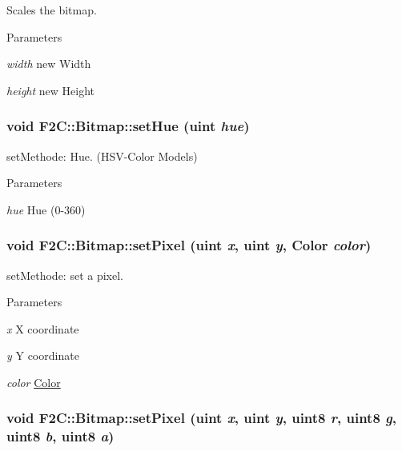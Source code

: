 Scales the bitmap. 
\begin{DoxyParams}{Parameters}
\item[{\em width}]new Width \item[{\em height}]new Height \end{DoxyParams}
\hypertarget{class_f2_c_1_1_bitmap_aaa06d532deca94bc4c655951a137c49a}{
\subsubsection[{setHue}]{\setlength{\rightskip}{0pt plus 5cm}void F2C::Bitmap::setHue ({\bf uint} {\em hue})}}
\label{class_f2_c_1_1_bitmap_aaa06d532deca94bc4c655951a137c49a}


setMethode: Hue. (HSV-\/Color Models) 
\begin{DoxyParams}{Parameters}
\item[{\em hue}]Hue (0-\/360) \end{DoxyParams}
\hypertarget{class_f2_c_1_1_bitmap_ada18c311c9e0cd0ba4c413b7cce2fb62}{
\subsubsection[{setPixel}]{\setlength{\rightskip}{0pt plus 5cm}void F2C::Bitmap::setPixel ({\bf uint} {\em x}, \/  {\bf uint} {\em y}, \/  {\bf Color} {\em color})}}
\label{class_f2_c_1_1_bitmap_ada18c311c9e0cd0ba4c413b7cce2fb62}


setMethode: set a pixel. 
\begin{DoxyParams}{Parameters}
\item[{\em x}]X coordinate \item[{\em y}]Y coordinate \item[{\em color}]\hyperlink{class_f2_c_1_1_color}{Color} \end{DoxyParams}
\hypertarget{class_f2_c_1_1_bitmap_ad91aa72b9159925e6b09a13f408a603d}{
\subsubsection[{setPixel}]{\setlength{\rightskip}{0pt plus 5cm}void F2C::Bitmap::setPixel ({\bf uint} {\em x}, \/  {\bf uint} {\em y}, \/  {\bf uint8} {\em r}, \/  {\bf uint8} {\em g}, \/  {\bf uint8} {\em b}, \/  {\bf uint8} {\em a})}}
\label{class_f2_c_1_1_bitmap_ad91aa72b9159925e6b09a13f408a603d}


